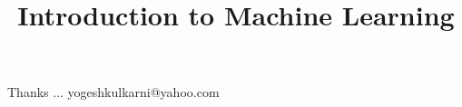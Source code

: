 \documentclass[xcolor=dvipsnames,compress,t,pdf,notes]{beamer}
\title[\insertframenumber /\inserttotalframenumber]{Introduction to Machine Learning}
\begin{document}
	\begin{frame}
	\titlepage
	\end{frame}

	

	\begin{frame}[c]{}
	Thanks ...
	\vspace{5mm}
	yogeshkulkarni@yahoo.com
	\end{frame}
\end{document}
